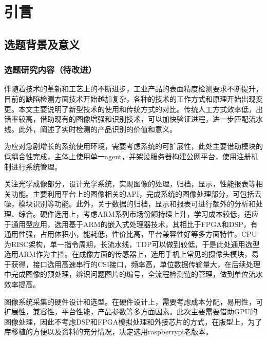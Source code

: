 \chapter{引言}
\section{选题背景及意义}
\subsection{选题研究内容（待改进）}
伴随着技术的革新和工艺上的不断进步，工业产品的表面精度检测要求不断提升，目前的缺陷检测方面技术开始越加复杂，各种的技术的工作方式和原理开始出现变更。本文主要说明了新型技术的使用和传统方式的对比。传统人工方式效率低，出错率较高，借助现有的图像增强和识别技术，可以加快验证进程，进一步匹配流水线。此外，阐述了实时检测的产品识别的价值和意义。

为应对急剧增长的系统使用环境，需要考虑系统的可扩展性，此处主要借助模块的低耦合性完成，主体上使用单一agent，并架设服务器构建公网平台，使用注册机制进行系统管理。

关注光学成像部分，设计光学系统，实现图像的处理，归档，显示，性能报表等相关功能。主要利用平台上的图像相关的API，完成系统的图像处理部分，可包括去噪，模块识别等功能。此外，关于数据的归档，显示和报表可进行额外的分析和处理、综合。硬件选用上，考虑ARM系列市场份额持续上升，学习成本较低，适应于通用型应用，选用基于ARM的嵌入式处理器技术，其相比于FPGA和DSP，有通用性强，占用体积小，能耗低，性价比高，平台兼容性好等多方面特性。CPU为RISC架构，单一指令周期，长流水线，TDP可以做到较低，于是此处通用选型选用ARM作为主控。在成像方面的传感器上，选用手机上常见的摄像头模块，易于获得，接口选用高速串行的CSI接口，频率高，单位数据传输量大，在后续处理中完成图像的预处理，辨识问题图片的编号，全流程检测链的管理，做到单位流水效率提高。

图像系统采集的硬件设计和选型。在硬件设计上，需要考虑成本分配，易用性，可扩展性，兼容性，平台性能，产品参数等多方面因素。此次主要需要借助GPU的图像处理，因此不考虑DSP和FPGA模拟处理和外接芯片的方式，在版型上，为了库移植的方便以及资料的充分情况，决定选用raspberrypi老版本。
